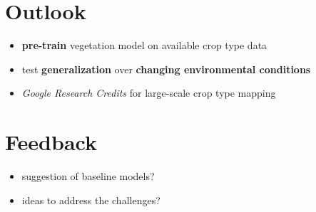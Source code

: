 \documentclass[a0]{tumposter}
\begin{document}
\begin{minipage}[t]{0.32\textwidth}
\begin{tikzpicture}[xscale=6, yscale=15]
	\end{tikzpicture}


	 \section{Outlook}
%	 
%	 	
	 	\begin{itemize}
	 		\item \textbf{pre-train} vegetation model on available crop type data
	 		\item test \textbf{generalization} over \textbf{changing environmental conditions}
	 		\item \textit{Google Research Credits} for large-scale crop type mapping  
	 	\end{itemize}
	 	
	 
	 \section{Feedback}
	 
	 \begin{itemize}
	 	\item suggestion of baseline models?
	 	\item ideas to address the challenges?
	 \end{itemize}

	\tiny
	
	

\end{minipage}

\begin{tikzpicture}[overlay]
\end{tikzpicture}
\end{document}
